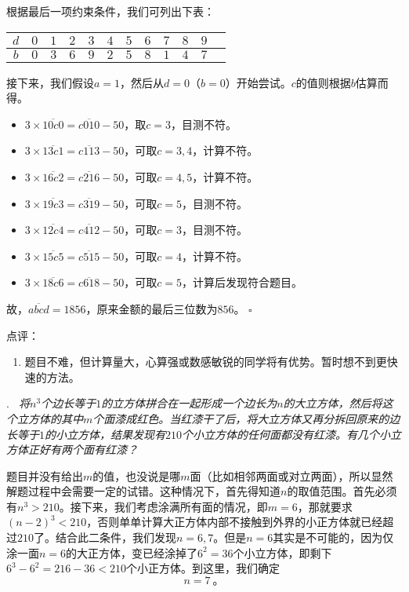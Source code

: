 \documentclass[a4,12pt]{article}
\newcounter{Problem}
\newcommand{\Problem}[1]{
		\vspace*{10pt}
		\stepcounter{Problem}
		\label{Problem \arabic{Problem}}
		\noindent\arabic{Problem}.\emph{~#1}
	}
\newcommand{\Qed}{\hfill\ensuremath{\square}}
\begin{document}
	根据最后一项约束条件，我们可列出下表：
	\begin{center}
	\begin{tabular}{c|ccccccccccc}
		$d$ & $0$ & $1$ & $2$ & $3$ & $4$ & $5$ & $6$ & $7$ & $8$ & $9$ \\
		\hline
		$b$ & $0$ & $3$ & $6$ & $9$ & $2$ & $5$ & $8$ & $1$ & $4$ & $7$ \\
	\end{tabular}
	\end{center}

	接下来，我们假设$a=1$，然后从$d=0$（$b=0$）开始尝试。$c$的值则根据$b$估算而得。
	\begin{itemize}
		\item $3\times\overline{10c0} = \overline{c010} - 50$，取$c=3$，目测不符。
		\item $3\times\overline{13c1} = \overline{c113} - 50$，可取$c=3,4$，计算不符。
		\item $3\times\overline{16c2} = \overline{c216} - 50$，可取$c=4,5$，计算不符。
		\item $3\times\overline{19c3} = \overline{c319} - 50$，可取$c=5$，目测不符。
		\item $3\times\overline{12c4} = \overline{c412} - 50$，可取$c=3$，目测不符。
		\item $3\times\overline{15c5} = \overline{c515} - 50$，可取$c=4$，计算不符。
		\item $3\times\overline{18c6} = \overline{c618} - 50$，可取$c=5$，计算后发现符合题目。
	\end{itemize}
	故，$\overline{abcd} = 1856$，原来金额的最后三位数为$856$。
	\Qed
	\vspace*{30pt}

	\noindent 点评：
	\begin{enumerate}[label=(\alph*)]
		\item 题目不难，但计算量大，心算强或数感敏锐的同学将有优势。暂时想不到更快速的方法。
	\end{enumerate}

\pagebreak
\Problem{
	将$n^3$个边长等于$1$的立方体拼合在一起形成一个边长为$n$的大立方体，然后将这个立方体的其中$m$个面漆成红色。当红漆干了后，将大立方体又再分拆回原来的边长等于$1$的小立方体，结果发现有$210$个小立方体的任何面都没有红漆。有几个小立方体正好有两个面有红漆？
	}

	题目并没有给出$m$的值，也没说是哪$m$面（比如相邻两面或对立两面），所以显然解题过程中会需要一定的试错。这种情况下，首先得知道$n$的取值范围。首先必须有$n^3 > 210$。接下来，我们考虑涂满所有面的情况，即$m=6$，那就要求$(n-2)^3<210$，否则单单计算大正方体内部不接触到外界的小正方体就已经超过$210$了。结合此二条件，我们发现$n = 6, 7$。但是$n=6$其实是不可能的，因为仅涂一面$n=6$的大正方体，变已经涂掉了$6^2=36$个小立方体，即剩下$6^3-6^2 = 216-36 < 210$个小正方体。到这里，我们确定
	\[ n = 7 \ \mbox{。} \]
\end{document}
